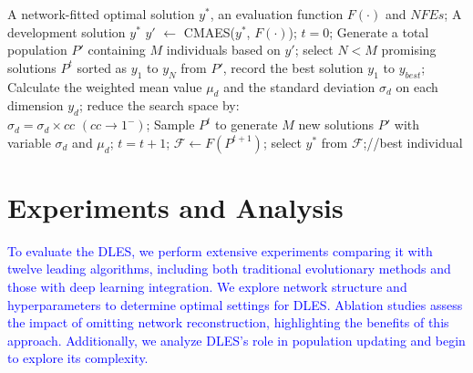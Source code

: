 \documentclass[journal,twoside]{IEEEtran}
\begin{document}
\begin{algorithm}[t]
	\caption{\textcolor{blue}{Hybrid Exploitation}} 
	\label{exploitation} 
	\renewcommand{\algorithmicrequire}{\textbf{Input:}}
	\renewcommand{\algorithmicensure}{\textbf{Output:}}
	\begin{algorithmic}[1]
		\REQUIRE A network-fitted optimal solution $y^{*}$, an evaluation function $F(\cdot)$ and $N\!F\!E\!s$;
		\ENSURE  A development solution $y^{*}$
		\STATE $y'$ $\leftarrow$ CMAES($y^{*}$, $F(\cdot)$);
		\STATE $t = 0$;
		\STATE Generate a total population $P'$ containing $M$ individuals based on $y'$;
		\STATE select $N < M$ promising solutions $P^{t}$ sorted as $y_{1}$ to $y_{N}$ from $P'$, record the best solution $y_{1}$ to $y_{best}$;
		\STATE Calculate the weighted mean value $\mu_{d}$ and the standard deviation $\sigma_{d}$  on each dimension $y_{d}$;
		\STATE reduce the search space by:\\ $\sigma_{d} =\sigma_{d} \times cc$ $ (cc \rightarrow 1^{-})$;
		\ENDIF
		\STATE Sample $P^{t}$ to generate $M$ new solutions $P'$ with variable $\sigma_{d}$ and  $\mu_{d}$;
		\STATE $t = t+1$;
		\ENDWHILE
		\STATE $\mathcal{F} \leftarrow F(P^{t+1})$; 
		\STATE select $y^{*}$ from $\mathcal{F}$;//best individual 
	\end{algorithmic} 
\end{algorithm}

\section{Experiments and Analysis}\label{Expre and analy}
\textcolor{blue}{
To evaluate the DLES, we perform extensive experiments comparing it with twelve leading algorithms, including both traditional evolutionary methods and those with deep learning integration. We explore network structure and hyperparameters to determine optimal settings for DLES. Ablation studies assess the impact of omitting network reconstruction, highlighting the benefits of this approach. Additionally, we analyze DLES's role in population updating and begin to explore its complexity.}
\end{document}
